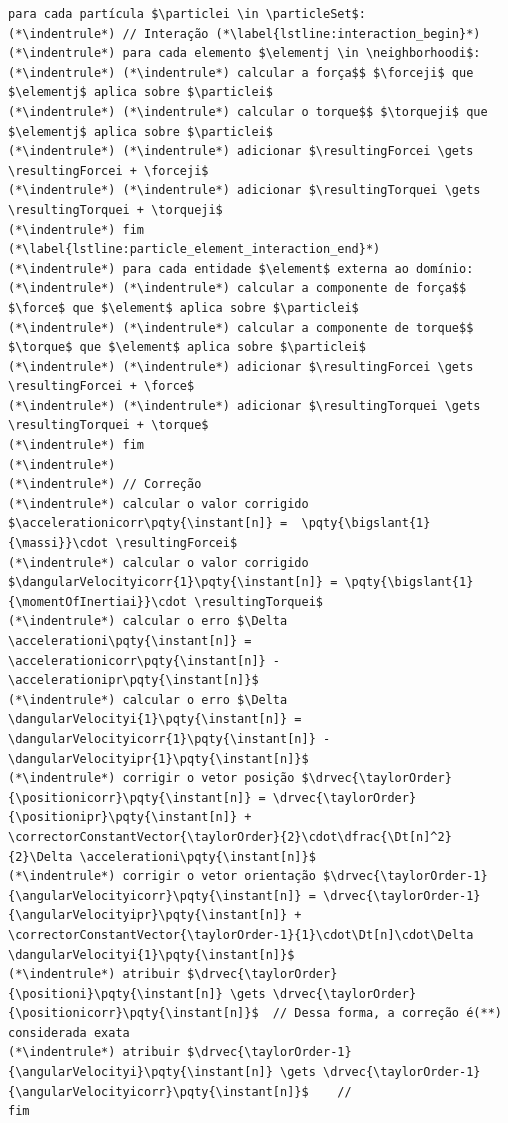 \begin{lstlisting}[float, floatplacement=h, language=pseudocode, label=lst:equations_solution, caption=Pseudocódigo para a solução das equações de movimento de partículas esféricas por meio do algoritmo de Gear.]
para cada partícula $\particlei \in \particleSet$:
(*\indentrule*)	// Interação (*\label{lstline:interaction_begin}*)
(*\indentrule*)	para cada elemento $\elementj \in \neighborhoodi$:
(*\indentrule*)	(*\indentrule*)	calcular a força$$ $\forceji$ que $\elementj$ aplica sobre $\particlei$
(*\indentrule*)	(*\indentrule*)	calcular o torque$$ $\torqueji$ que $\elementj$ aplica sobre $\particlei$
(*\indentrule*)	(*\indentrule*)	adicionar $\resultingForcei \gets \resultingForcei + \forceji$
(*\indentrule*)	(*\indentrule*)	adicionar $\resultingTorquei \gets \resultingTorquei + \torqueji$
(*\indentrule*)	fim (*\label{lstline:particle_element_interaction_end}*)
(*\indentrule*)	para cada entidade $\element$ externa ao domínio:
(*\indentrule*)	(*\indentrule*)	calcular a componente de força$$ $\force$ que $\element$ aplica sobre $\particlei$
(*\indentrule*)	(*\indentrule*)	calcular a componente de torque$$ $\torque$ que $\element$ aplica sobre $\particlei$
(*\indentrule*)	(*\indentrule*)	adicionar $\resultingForcei \gets \resultingForcei + \force$
(*\indentrule*)	(*\indentrule*)	adicionar $\resultingTorquei \gets \resultingTorquei + \torque$
(*\indentrule*)	fim
(*\indentrule*)
(*\indentrule*)	// Correção
(*\indentrule*)	calcular o valor corrigido $\accelerationicorr\pqty{\instant[n]} =  \pqty{\bigslant{1}{\massi}}\cdot \resultingForcei$
(*\indentrule*)	calcular o valor corrigido $\dangularVelocityicorr{1}\pqty{\instant[n]} = \pqty{\bigslant{1}{\momentOfInertiai}}\cdot \resultingTorquei$
(*\indentrule*)	calcular o erro $\Delta \accelerationi\pqty{\instant[n]} = \accelerationicorr\pqty{\instant[n]} - \accelerationipr\pqty{\instant[n]}$
(*\indentrule*)	calcular o erro $\Delta \dangularVelocityi{1}\pqty{\instant[n]} = \dangularVelocityicorr{1}\pqty{\instant[n]} - \dangularVelocityipr{1}\pqty{\instant[n]}$
(*\indentrule*)	corrigir o vetor posição $\drvec{\taylorOrder}{\positionicorr}\pqty{\instant[n]} = \drvec{\taylorOrder}{\positionipr}\pqty{\instant[n]} + \correctorConstantVector{\taylorOrder}{2}\cdot\dfrac{\Dt[n]^2}{2}\Delta \accelerationi\pqty{\instant[n]}$
(*\indentrule*)	corrigir o vetor orientação $\drvec{\taylorOrder-1}{\angularVelocityicorr}\pqty{\instant[n]} = \drvec{\taylorOrder-1}{\angularVelocityipr}\pqty{\instant[n]} + \correctorConstantVector{\taylorOrder-1}{1}\cdot\Dt[n]\cdot\Delta \dangularVelocityi{1}\pqty{\instant[n]}$
(*\indentrule*)	atribuir $\drvec{\taylorOrder}{\positioni}\pqty{\instant[n]} \gets \drvec{\taylorOrder}{\positionicorr}\pqty{\instant[n]}$	// Dessa forma, a correção é(**) considerada exata
(*\indentrule*)	atribuir $\drvec{\taylorOrder-1}{\angularVelocityi}\pqty{\instant[n]} \gets \drvec{\taylorOrder-1}{\angularVelocityicorr}\pqty{\instant[n]}$	//		
fim
\end{lstlisting}

